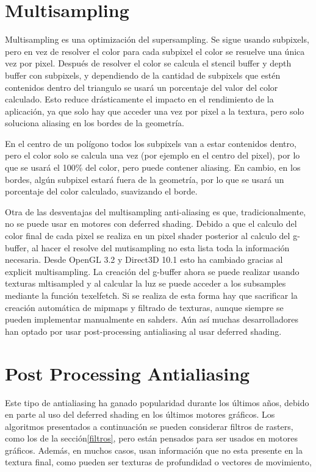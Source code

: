 \documentclass[withindex, glossary]{cam-thesis}
\begin{document}
\section{Multisampling}

Multisampling es una optimización del supersampling. Se sigue usando subpixels, pero en vez de resolver el color para cada subpixel el color se resuelve una única vez por pixel. Después de resolver el color se calcula el stencil buffer y depth buffer con subpixels, y dependiendo de la cantidad de subpixels que estén contenidos dentro del triangulo se usará un porcentaje del valor del color calculado. Esto reduce drásticamente el impacto en el rendimiento de la aplicación, ya que solo hay que acceder una vez por pixel a la textura, pero solo soluciona aliasing en los bordes de la geometría.

En el centro de un polígono todos los subpixels van a estar contenidos dentro, pero el color solo se calcula una vez (por ejemplo en el centro del pixel), por lo que se usará el 100\% del color, pero puede contener aliasing. En cambio, en los bordes, algún subpixel estará fuera de la geometría, por lo que se usará un porcentaje del color calculado, suavizando el borde.

Otra de las desventajas del multisampling anti-aliasing es que, tradicionalmente, no se puede usar en motores con deferred shading. Debido a que el calculo del color final de cada pixel se realiza en un pixel shader posterior al calculo del g-buffer, al hacer el resolve del mutisampling no esta lista toda la información necesaria. Desde OpenGL 3.2 y Direct3D 10.1 esto ha cambiado gracias al explicit multisampling\cite{textureMultisample}. La creación del g-buffer ahora se puede realizar usando texturas mltisampled y al calcular la luz se puede acceder a los subsamples mediante la función texelfetch. Si se realiza de esta forma hay que sacrificar la creación automática de mipmaps y filtrado de texturas, aunque siempre se pueden implementar manualmente en sahders. Aún así muchas desarrolladores han optado por usar post-processing antialiasing al usar deferred shading.

\section{Post Processing Antialiasing}

Este tipo de antialiasing ha ganado popularidad durante los últimos años, debido en parte al uso del deferred shading en los últimos motores gráficos. Los algoritmos presentados a continuación se pueden considerar filtros de rasters, como los de la sección\ref{filtros}, pero están pensados para ser usados en motores gráficos. Además, en muchos casos, usan información que no esta presente en la textura final, como pueden ser texturas de profundidad o vectores de movimiento,
\end{document}
